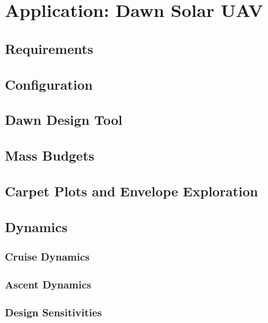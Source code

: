 \chapter{Application: Dawn Solar UAV}
\label{chapter:dawn}

\section{Requirements}

\section{Configuration}

\section{Dawn Design Tool}


\section{Mass Budgets}

\section{Carpet Plots and Envelope Exploration}

\section{Dynamics}

\subsection{Cruise Dynamics}

\subsection{Ascent Dynamics}

\subsection{Design Sensitivities}
